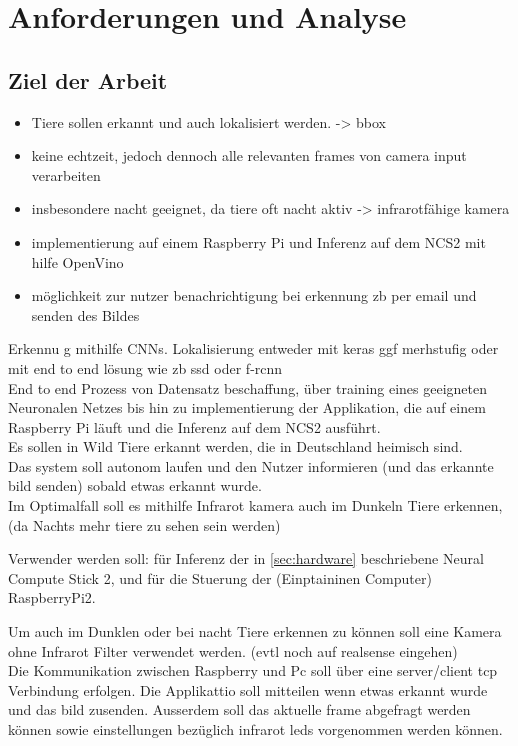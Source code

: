 \chapter{Anforderungen und Analyse}\label{kap:anforderunganalyse}

\section{Ziel der Arbeit}\label{sec:zielderarbeit}

\begin{itemize}
    \item Tiere sollen erkannt und auch lokalisiert werden. -> bbox
    \item keine echtzeit, jedoch dennoch alle relevanten frames von camera input verarbeiten
    \item insbesondere nacht geeignet, da tiere oft nacht aktiv -> infrarotfähige kamera
    \item implementierung auf einem Raspberry Pi und Inferenz auf dem NCS2 mit hilfe OpenVino
    \item möglichkeit zur nutzer benachrichtigung bei erkennung zb per email und senden des Bildes
\end{itemize}
Erkennu g mithilfe CNNs. Lokalisierung entweder mit keras ggf merhstufig oder 
mit end to end lösung wie zb ssd oder f-rcnn
\\
End to end Prozess von Datensatz beschaffung, über training eines geeigneten Neuronalen 
Netzes bis hin zu implementierung der Applikation, 
die auf einem Raspberry Pi läuft und die Inferenz auf dem NCS2 ausführt.
\\
Es sollen in Wild Tiere erkannt werden, die in Deutschland heimisch sind.\\
Das system soll autonom laufen und den Nutzer informieren (und das erkannte bild senden) 
sobald etwas erkannt wurde.\\
Im Optimalfall soll es mithilfe Infrarot kamera auch im Dunkeln Tiere erkennen, 
(da Nachts mehr tiere zu sehen sein werden)


Verwender werden soll: für Inferenz der in \ref{sec:hardware} beschriebene
Neural Compute Stick 2, und für die Stuerung der (Einptaininen Computer) 
RaspberryPi2. 

Um auch im Dunklen oder bei nacht Tiere erkennen zu können soll eine Kamera ohne
Infrarot Filter verwendet werden. (evtl noch auf realsense eingehen)
\\
Die Kommunikation zwischen Raspberry und Pc soll über eine server/client tcp 
Verbindung erfolgen. Die Applikattio soll mitteilen wenn etwas erkannt wurde 
und das bild zusenden. Ausserdem soll das aktuelle frame abgefragt werden können
sowie einstellungen bezüglich infrarot leds vorgenommen werden können.






